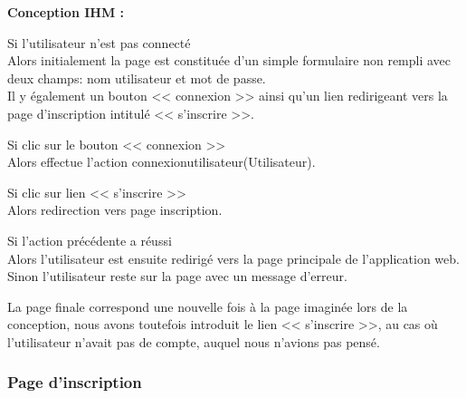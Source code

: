 			\begin{paragraphe}
				\textbf{Conception IHM :}
			\end{paragraphe}

			\begin{paragraphe}
				Si l'utilisateur n'est pas connecté \\
				Alors initialement la page est constituée d'un simple formulaire non rempli avec deux champs: nom utilisateur et mot de passe.\\
				 Il y également un bouton << connexion >> ainsi qu'un lien redirigeant vers la page d'inscription intitulé << s'inscrire >>.
			\end{paragraphe}


			\begin{paragraphe}
				Si clic sur le bouton << connexion >> \\
				Alors effectue l'action connexionutilisateur(Utilisateur).
			\end{paragraphe}

            \begin{paragraphe}
                Si clic sur lien  << s'inscrire >> \\
                Alors redirection vers page inscription.
            \end{paragraphe}

			\begin{paragraphe}
				Si l'action précédente a réussi \\
				Alors l'utilisateur est ensuite redirigé vers la page principale de l'application web.
				Sinon l'utilisateur reste sur la page avec un message d'erreur.
			\end{paragraphe}

        \newpage
            \begin{paragraphe}
                La page finale correspond une nouvelle fois à la page imaginée lors de la conception, nous avons toutefois introduit
                 le lien << s'inscrire >>, au cas où l'utilisateur n'avait pas de compte, auquel nous n'avions pas pensé.
            \end{paragraphe}


    \clearpage

		\subsubsection{Page d'inscription}

